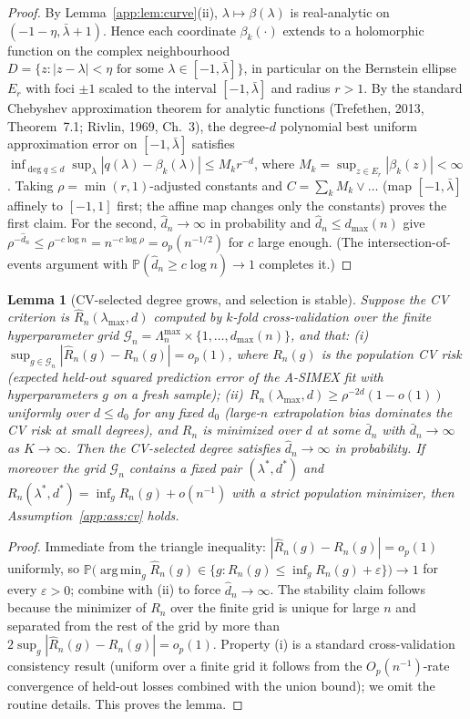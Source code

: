 \documentclass[11pt]{article}
\theoremstyle{plain}
\newtheorem{lemma}{Lemma}
\theoremstyle{definition}
\newcommand{\Prob}{\mathbb{P}}
\DeclareMathOperator*{\argmin}{arg\,min}
\newcommand{\asimex}{\textup{A-SIMEX}}
\begin{document}
\begin{proof}
By Lemma~\ref{app:lem:curve}(ii), $\lambda\mapsto\beta(\lambda)$ is
real-analytic on $(-1-\eta,\bar\lambda+1)$. Hence each coordinate
$\beta_k(\cdot)$ extends to a holomorphic function on the complex
neighbourhood $D=\{z:|z-\lambda|<\eta \text{ for some }
\lambda\in[-1,\bar\lambda]\}$, in particular on the Bernstein ellipse
$E_r$ with foci $\pm 1$ scaled to the interval $[-1,\bar\lambda]$ and
radius $r>1$. By the standard Chebyshev approximation theorem for
analytic functions (Trefethen, 2013, Theorem~7.1; Rivlin, 1969, Ch.~3), the degree-$d$
polynomial best uniform approximation error on $[-1,\bar\lambda]$
satisfies
$\inf_{\deg q\le d}\sup_{\lambda}|q(\lambda)-\beta_k(\lambda)|
\le M_k r^{-d}$, where
$M_k=\sup_{z\in E_r}|\beta_k(z)|<\infty$. Taking
$\rho=\min(r,1)$-adjusted constants and
$C=\sum_k M_k\vee\ldots$ (map $[-1,\bar\lambda]$ affinely to $[-1,1]$
first; the affine map changes only the constants) proves the first claim.
For the second, $\hat d_n\to\infty$ in probability and
$\hat d_n\le d_{\max}(n)$ give
$\rho^{-\hat d_n}\le\rho^{-c\log n}=n^{-c\log\rho}=o_p(n^{-1/2})$ for
$c$ large enough. (The intersection-of-events argument with
$\Prob(\hat d_n\ge c\log n)\to 1$ completes it.)
\end{proof}

\begin{lemma}[CV-selected degree grows, and selection is stable]\label{app:lem:cv}
Suppose the CV criterion is $\widehat R_n(\lambda_{\max},d)$ computed by
$k$-fold cross-validation over the finite hyperparameter grid
$\mathcal G_n=\Lambda_n^{\max}\times\{1,\dots,d_{\max}(n)\}$, and that:
(i)~$\sup_{g\in\mathcal G_n}|\widehat R_n(g)-R_n(g)|=o_p(1)$, where
$R_n(g)$ is the population CV risk (expected held-out squared prediction
error of the \asimex{} fit with hyperparameters $g$ on a fresh sample);
(ii)~$R_n(\lambda_{\max},d)\ge \rho^{-2d}(1-o(1))$ uniformly over
$d\le d_0$ for any fixed $d_0$ (large-$n$ extrapolation bias dominates
the CV risk at small degrees), and $R_n$ is minimized over $d$ at some
$\bar d_n$ with $\bar d_n\to\infty$ as $K\to\infty$.
Then the CV-selected degree satisfies
$\hat d_n\to\infty$ in probability. If moreover the grid
$\mathcal G_n$ contains a fixed pair $(\lambda^*,d^*)$ and
$R_n(\lambda^*,d^*)=\inf_g R_n(g)+o(n^{-1})$ with a strict population
minimizer, then Assumption~\ref{app:ass:cv} holds.
\end{lemma}

\begin{proof}
Immediate from the triangle inequality:
$|\widehat R_n(g)-R_n(g)|=o_p(1)$ uniformly, so
$\Prob\bigl(\argmin_g\widehat R_n(g)\in\{g:R_n(g)\le\inf_gR_n(g)+\varepsilon\}\bigr)
\to 1$ for every $\varepsilon>0$; combine with (ii) to force
$\hat d_n\to\infty$. The stability claim follows because the minimizer of
$R_n$ over the finite grid is unique for large $n$ and separated from the
rest of the grid by more than $2\sup_g|\widehat R_n(g)-R_n(g)|=o_p(1)$.
Property (i) is a standard cross-validation consistency result
(uniform over a finite grid it follows from the $O_p(n^{-1})$-rate
convergence of held-out losses combined with the union bound); we omit the
routine details. This proves the lemma.
\end{proof}
\end{document}
